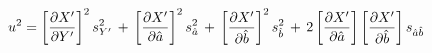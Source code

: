 \documentclass[12pt]{article}
\begin{document}
\pagestyle{empty}
\Large
{}
\pagecolor{ehandbook}


\[
\hspace{-.25in}u^2 =
\left[ \frac{\partial{X'}}{\partial{Y'}} \right]^2 s_{Y'}^2 \, + \,
\left[ \frac{\partial{X'}}{\partial{\hat{a}}} \right]^2 s_{\hat{a}}^2 \, + \,
\left[ \frac{\partial{X'}}{\partial{\hat{b}}} \right]^2 s_{\hat{b}}^2 \, + \,
2 \left[ \frac{\partial{X'}}{\partial{\hat{a}}} \right]
  \left[ \frac{\partial{X'}}{\partial{\hat{b}}} \right] s_{\hat{a}\hat{b}}
\]
\end{document}
